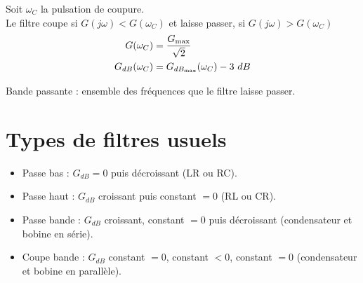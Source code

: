 \documentclass[13pt, twoside, a4paper, french]{report}
\begin{document}
    Soit $\omega_C$ la pulsation de coupure.\\
    Le filtre coupe si $G(j\omega) < G(\omega_C)$ et laisse passer, si $G(j\omega) > G(\omega_C)$
    \begin{align*}
        G(\omega_C) &= \dfrac{G_{\max}}{\sqrt{2}}\\
        G_{dB}(\omega_C) &= G_{dB_\textrm{max}}(\omega_C) - 3\ dB
    \end{align*}

    Bande passante : ensemble des fréquences que le filtre laisse passer.

    \section{Types de filtres usuels}\label{sec:types-de-filtres-usuels}

    \begin{itemize}
        \item Passe bas : $G_{dB} = 0$ puis décroissant (LR ou RC).
        \item Passe haut : $G_{dB}$ croissant puis constant $= 0$ (RL ou CR).
        \item Passe bande : $G_{dB}$ croissant, constant $= 0$ puis décroissant (condensateur et bobine en série).
        \item Coupe bande : $G_{dB}$ constant $= 0$, constant $< 0$, constant $= 0$ (condensateur et bobine en parallèle).
    \end{itemize}
\end{document}
